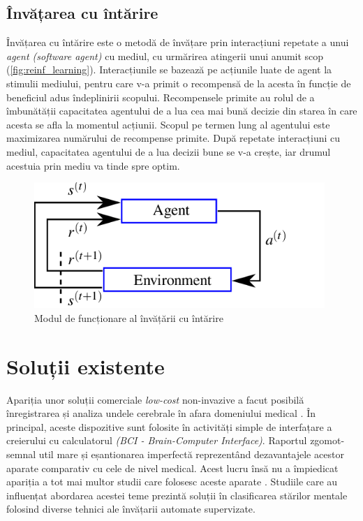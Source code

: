 \subsection*{Învățarea cu întărire}
Învățarea cu întărire este o metodă de învățare prin interacțiuni repetate a unui \textit{agent (software agent)} cu mediul, cu urmărirea atingerii unui anumit scop (\autoref*{fig:reinf_learning}). Interacțiunile se bazează pe acțiunile luate de agent la stimulii mediului, pentru care v-a primit o recompensă de la acesta în funcție de beneficiul adus îndeplinirii scopului. Recompensele primite au rolul de a îmbunătății capacitatea agentului de a lua cea mai bună decizie din starea în care acesta se afla la momentul acțiunii. Scopul pe termen lung al agentului este maximizarea numărului de recompense primite. După repetate interacțiuni cu mediul, capacitatea agentului de a lua decizii bune se v-a crește, iar drumul acestuia prin mediu va tinde spre optim.
\begin{figure}[H]
	\center
	\includegraphics[width=11cm, keepaspectratio]{fig/cap1/The-reinforcement-learning-paradigm-consists-of-an-agent-interacting-with-an.png}
	\caption{Modul de funcționare al învățării cu întărire \cite{fig:reinforcement}}
	\label{fig:reinf_learning}
\end{figure}

\section{Soluții existente}
Apariția unor soluții comerciale \textit{low-cost} non-invazive a facut posibilă înregistrarea și analiza undele cerebrale în afara domeniului medical \cite{online:emotiv}. În principal, aceste dispozitive sunt folosite în activități simple de interfațare a creierului cu calculatorul \textit{(BCI - Brain-Computer Interface)}. Raportul zgomot-semnal util mare și eșantionarea imperfectă reprezentând dezavantajele acestor aparate comparativ cu cele de nivel medical. Acest lucru însă nu a împiedicat apariția a tot mai multor studii care folosesc aceste aparate \cite{consumer-eeg:2018}. Studiile care au influențat abordarea acestei teme prezintă soluții în clasificarea stărilor mentale folosind diverse tehnici ale învățarii automate supervizate.

